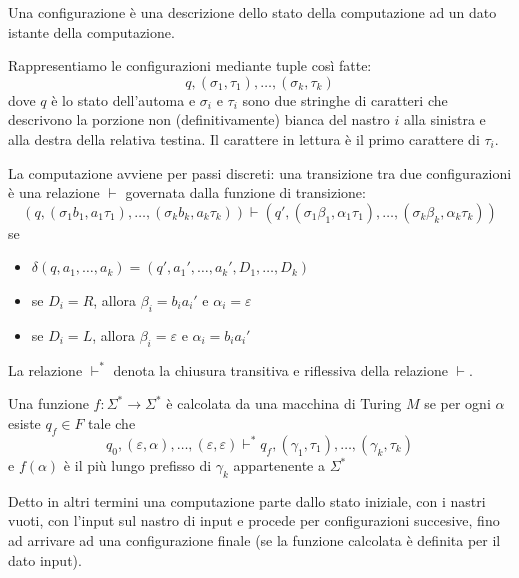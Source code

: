 Una configurazione è una descrizione dello stato della computazione ad un dato istante della
computazione.

Rappresentiamo le configurazioni mediante tuple così fatte:
\begin{equation*}
    q, (\sigma_{1},\tau_{1}),\dotsc,(\sigma_{k},\tau_{k})
\end{equation*}
dove $q$ è lo stato dell'automa e $\sigma_{i}$ e $\tau_{i}$ sono due stringhe di caratteri che
descrivono la porzione non (definitivamente) bianca del nastro $i$ alla sinistra e alla destra della
relativa testina. Il carattere in lettura è il primo carattere di $\tau_{i}$.

La computazione avviene per passi discreti: una transizione tra due configurazioni è una relazione
$\vdash$ governata dalla funzione di transizione:
\begin{equation*}
    (q,(\sigma_{1}b_{1},a_{1}\tau_{1}),\dotsc,(\sigma_{k}b_{k},a_{k}\tau_{k})) \vdash
    (q',(\sigma_{1}\beta_{1},\alpha_{1}\tau_{1}),\dotsc,(\sigma_{k}\beta_{k},\alpha_{k}\tau_{k}))
\end{equation*}
se
\begin{itemize}
    \item $\delta(q,a_{1},\dotsc,a_{k}) = (q',a_{1}',\dotsc,a_{k}',D_{1},\dotsc,D_{k})$
    \item se $D_{i} = R$, allora $\beta_{i} = b_{i}a_{i}'$ e $\alpha_{i} = \varepsilon$
    \item se $D_{i} = L$, allora $\beta_{i} = \varepsilon$ e $\alpha_{i} = b_{i}a_{i}'$
\end{itemize}

La relazione $\vdash^{*}$ denota la chiusura transitiva e riflessiva della relazione $\vdash$.

\begin{defn}
    Una funzione $f: \Sigma^{*} \to \Sigma^{*}$ è calcolata da una macchina di Turing $M$ se per
    ogni $\alpha$ esiste $q_{f} \in F$ tale che
    \begin{equation*}
        q_{0}, (\varepsilon,\alpha),\dotsc,(\varepsilon,\varepsilon) \vdash^{*} q_{f},
        (\gamma_{1},\tau_{1}),\dotsc,(\gamma_{k},\tau_{k})
    \end{equation*}
    e $f(\alpha)$ è il più lungo prefisso di $\gamma_{k}$ appartenente a $\Sigma^{*}$
\end{defn}

Detto in altri termini una computazione parte dallo stato iniziale, con i nastri vuoti, con l'input
sul nastro di input e procede per configurazioni succesive, fino ad arrivare ad una configurazione
finale (se la funzione calcolata è definita per il dato input).

